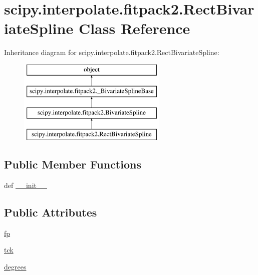 \hypertarget{classscipy_1_1interpolate_1_1fitpack2_1_1RectBivariateSpline}{}\section{scipy.\+interpolate.\+fitpack2.\+Rect\+Bivariate\+Spline Class Reference}
\label{classscipy_1_1interpolate_1_1fitpack2_1_1RectBivariateSpline}
Inheritance diagram for scipy.\+interpolate.\+fitpack2.\+Rect\+Bivariate\+Spline\+:\begin{figure}[H]
\begin{center}
\leavevmode
\includegraphics[height=4.000000cm]{classscipy_1_1interpolate_1_1fitpack2_1_1RectBivariateSpline}
\end{center}
\end{figure}
\subsection*{Public Member Functions}
\begin{DoxyCompactItemize}
\item 
def \hyperlink{classscipy_1_1interpolate_1_1fitpack2_1_1RectBivariateSpline_aeae531b971d9d7f733e50453e6c15cfd}{\+\_\+\+\_\+init\+\_\+\+\_\+}
\end{DoxyCompactItemize}
\subsection*{Public Attributes}
\begin{DoxyCompactItemize}
\item 
\hyperlink{classscipy_1_1interpolate_1_1fitpack2_1_1RectBivariateSpline_a4ea4dc15ff9b86952c96e7772a73e7d0}{fp}
\item 
\hyperlink{classscipy_1_1interpolate_1_1fitpack2_1_1RectBivariateSpline_ae3d459bb85f77d7b4f866e69ff23f8f1}{tck}
\item 
\hyperlink{classscipy_1_1interpolate_1_1fitpack2_1_1RectBivariateSpline_aa1b4bc4776b2f8bc3796f294288eb875}{degrees}
\end{DoxyCompactItemize}


